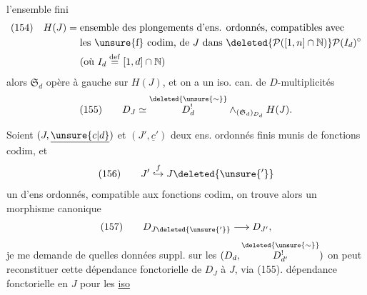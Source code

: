 l'ensemble fini
\[
\begin{aligned}
(154)\quad H(J)={}&\text{ensemble des plongements d'ens. ordonnés, compatibles avec}\\
&\text{les \unsure{f} codim, de }J\text{ dans }\deleted{\mathcal P([1,n]\cap\mathbb N)}\mathcal P(I_d)^\circ\\
&\text{(où }I_d\overset{\mathrm{def}}=[1,d]\cap\mathbb N\text{)}
\end{aligned}
\]
alors $\mathfrak S_d$ opère à gauche sur $H(J)$, et on a un iso. can. de $D$-multiplicités
\[
(155)\qquad D_J\simeq\overset{\deleted{\unsure{\sim}}}{D^!_d}\mathbin{\wedge}_{(\mathfrak S_d)_{D_d}}H(J).
\]

Soient  $(J,\underline{\unsure{c|d}})$ et $(J',\underline{c}')$ deux ens. ordonnés finis munis de fonctions codim, et
\[
(156)\qquad J'\mathrel{\overset{f}{\hookrightarrow}}J\deleted{\unsure{'}}
\]
un  d'ens ordonnés, compatible aux fonctions codim, on trouve alors un  morphisme canonique
\[
(157)\qquad D_{J\deleted{\unsure{'}}}\longrightarrow D_{J'},
\]
je me demande  de quelles données suppl.  sur les $(D_d,\overset{\deleted{\unsure{\sim}}}{D^!_{d'}})$ on peut reconstituer cette dépendance fonctorielle de $D_J$  à $J$, via (155).   dépendance fonctorielle en $J$ pour les \uline{iso}
